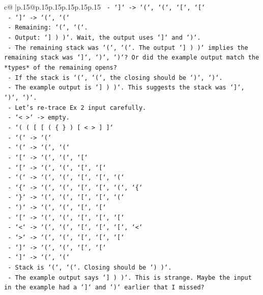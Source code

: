 \documentclass{article}
\begin{document}
{\begin{supertabular}{c@{$\;$}|p{.15\linewidth}@{}p{.15\linewidth}p{.15\linewidth}p{.15\linewidth}p{.15\linewidth}p{.15\linewidth}}
{{{\texttt{     {-} `{]}` {-}> `(`, `(`, `{[}`, `{[}`} \\
\texttt{     {-} `{]}` {-}> `(`, `(`} \\
\texttt{   {-} Remaining: `(`, `(`.} \\
\texttt{   {-} Output: `{]} ) )`. Wait, the output uses `{]}` and `)`.} \\
\texttt{   {-} The remaining stack was `(`, `(`. The output `{]} ) )` implies the remaining stack was `{]}`, `)`, `)`? Or did the example output match the *types* of the remaining opens?} \\
\texttt{   {-} If the stack is `(`, `(`, the closing should be `)`, `)`.} \\
\texttt{   {-} The example output is `{]} ) )`. This suggests the stack was `{]}`, `)`, `)`.} \\
\texttt{   {-} Let's re{-}trace Ex 2 input carefully.} \\
\texttt{     {-} `< >` {-}> empty.} \\
\texttt{     {-} `( ( {[} {[} ( \{ \} ) {[} < > {]} {]}`} \\
\texttt{     {-} `(` {-}> `(`} \\
\texttt{     {-} `(` {-}> `(`, `(`} \\
\texttt{     {-} `{[}` {-}> `(`, `(`, `{[}`} \\
\texttt{     {-} `{[}` {-}> `(`, `(`, `{[}`, `{[}`} \\
\texttt{     {-} `(` {-}> `(`, `(`, `{[}`, `{[}`, `(`} \\
\texttt{     {-} `\{` {-}> `(`, `(`, `{[}`, `{[}`, `(`, `\{`} \\
\texttt{     {-} `\}` {-}> `(`, `(`, `{[}`, `{[}`, `(`} \\
\texttt{     {-} `)` {-}> `(`, `(`, `{[}`, `{[}`} \\
\texttt{     {-} `{[}` {-}> `(`, `(`, `{[}`, `{[}`, `{[}`} \\
\texttt{     {-} `<` {-}> `(`, `(`, `{[}`, `{[}`, `{[}`, `<`} \\
\texttt{     {-} `>` {-}> `(`, `(`, `{[}`, `{[}`, `{[}`} \\
\texttt{     {-} `{]}` {-}> `(`, `(`, `{[}`, `{[}`} \\
\texttt{     {-} `{]}` {-}> `(`, `(`} \\
\texttt{   {-} Stack is `(`, `(`. Closing should be `) )`.} \\
\texttt{   {-} The example output says `{]} ) )`. This is strange. Maybe the input in the example had a `{]}` and `)` earlier that I missed?} \\
}}}
\end{supertabular}}
\end{document}
